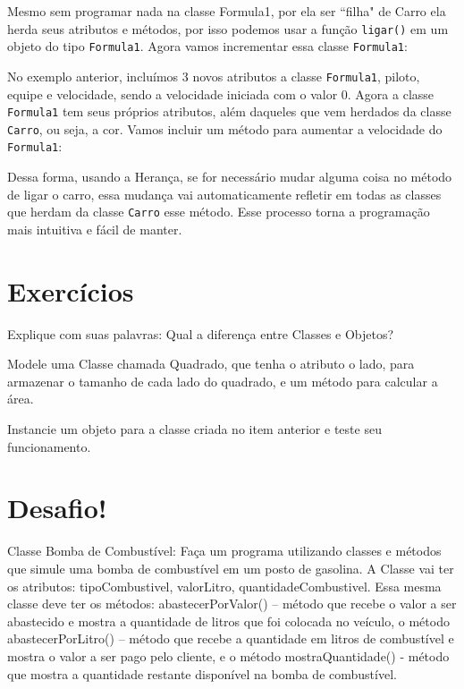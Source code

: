 

Mesmo sem programar nada na classe Formula1, por ela ser ``filha" de Carro ela herda 
seus atributos e métodos, por isso podemos usar a função \texttt{ligar()} em um objeto do tipo 
\texttt{Formula1}. Agora vamos incrementar essa classe \texttt{Formula1}:



No exemplo anterior, incluímos 3 novos atributos a classe \texttt{Formula1}, piloto, equipe e velocidade, 
sendo a velocidade iniciada com o valor 0. Agora a classe \texttt{Formula1} tem seus próprios atributos, 
além daqueles que vem herdados da classe \texttt{Carro}, ou seja, a cor. Vamos incluir um método para 
aumentar a velocidade do \texttt{Formula1}:



Dessa forma, usando a Herança, se for necessário mudar alguma coisa no método de ligar o carro, 
essa mudança vai automaticamente refletir em todas as classes que herdam da classe \texttt{Carro} 
esse método. Esse processo torna a programação mais intuitiva e fácil de manter. 

\section{Exercícios}
\label{cap12-exercicios}

\begin{description}[labelindent=30pt]
  \item [Q. 01] Explique com suas palavras: Qual a diferença entre Classes e Objetos?  
  \item [Q. 02] Modele uma Classe chamada Quadrado, que tenha o atributo o lado, para armazenar o 
  tamanho de cada lado do quadrado, e um método para calcular a área. 
  \item [Q. 03] Instancie um objeto para a classe criada no item anterior e teste seu funcionamento.

\end{description}

\section{Desafio!}
\label{cap12-desafio}

Classe Bomba de Combustível: Faça um programa utilizando classes e métodos que simule uma bomba de 
combustível em um posto de gasolina. A Classe vai ter os atributos: tipoCombustivel, valorLitro, 
quantidadeCombustivel. Essa mesma classe deve ter os métodos: abastecerPorValor() – método que 
recebe o valor a ser abastecido e mostra a quantidade de litros que foi colocada no veículo, o 
método abastecerPorLitro() – método que recebe a quantidade em litros de combustível e mostra o 
valor a ser pago pelo cliente, e o método mostraQuantidade() - método que mostra a quantidade 
restante disponível na bomba de combustível. 